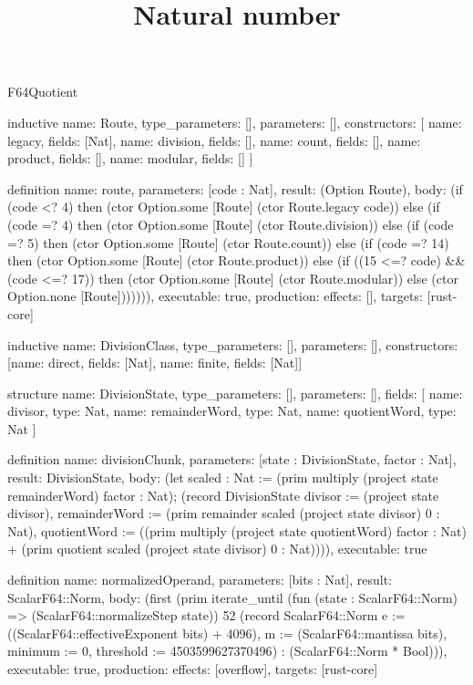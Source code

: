 \begin{lexlean}{F64Quotient}
\title{Natural number}
\begin{semanticmodule}
inductive{
  name: Route,
  type_parameters: [],
  parameters: [],
  constructors: [
    {name: legacy, fields: [Nat]},
    {name: division, fields: []},
    {name: count, fields: []},
    {name: product, fields: []},
    {name: modular, fields: []}
  ]
}

definition{
  name: route,
  parameters: [code : Nat],
  result: (Option Route),
  body: (if (code <? 4) then (ctor Option.some [Route] (ctor Route.legacy code)) else (if (code =? 4) then (ctor Option.some [Route] (ctor Route.division)) else (if (code =? 5) then (ctor Option.some [Route] (ctor Route.count)) else (if (code =? 14) then (ctor Option.some [Route] (ctor Route.product)) else (if ((15 <=? code) && (code <=? 17)) then (ctor Option.some [Route] (ctor Route.modular)) else (ctor Option.none [Route])))))),
  executable: true,
  production: {effects: [], targets: [rust-core]}
}

inductive{
  name: DivisionClass,
  type_parameters: [],
  parameters: [],
  constructors: [{name: direct, fields: [Nat]}, {name: finite, fields: [Nat]}]
}

structure{
  name: DivisionState,
  type_parameters: [],
  parameters: [],
  fields: [
    {name: divisor, type: Nat},
    {name: remainderWord, type: Nat},
    {name: quotientWord, type: Nat}
  ]
}

definition{
  name: divisionChunk,
  parameters: [state : DivisionState, factor : Nat],
  result: DivisionState,
  body: (let scaled : Nat := (prim multiply (project state remainderWord) factor : Nat); (record DivisionState {divisor := (project state divisor), remainderWord := (prim remainder scaled (project state divisor) 0 : Nat), quotientWord := ((prim multiply (project state quotientWord) factor : Nat) + (prim quotient scaled (project state divisor) 0 : Nat))})),
  executable: true
}

definition{
  name: normalizedOperand,
  parameters: [bits : Nat],
  result: ScalarF64::Norm,
  body: (first (prim iterate_until (fun (state : ScalarF64::Norm) => (ScalarF64::normalizeStep state)) 52 (record ScalarF64::Norm {e := ((ScalarF64::effectiveExponent bits) + 4096), m := (ScalarF64::mantissa bits), minimum := 0, threshold := 4503599627370496}) : (ScalarF64::Norm * Bool))),
  executable: true,
  production: {effects: [overflow], targets: [rust-core]}
}


\end{semanticmodule}
\end{lexlean}
